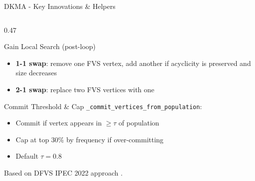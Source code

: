 \documentclass[aspectratio=169]{beamer}
\begin{document}
\begin{frame}{DKMA - Key Innovations \& Helpers}
\begin{columns}[T]
\begin{column}{0.47\textwidth}
\begin{block}{Gain Local Search (post-loop)}
\begin{itemize}
					\item \textbf{1-1 swap}: remove one FVS vertex, add another
					      if acyclicity is preserved and size decreases
					\item \textbf{2-1 swap}: replace two FVS vertices with one
				\end{itemize}
			\end{block}
			\vspace{4pt}
			\begin{block}{Commit Threshold \& Cap}
				\texttt{\_commit\_vertices\_from\_population}:
				\begin{itemize}
					\item Commit if vertex appears in $\ge \tau$ of population
					\item Cap at top 30\% by frequency if over-committing
					\item Default $\tau = 0.8$
				\end{itemize}
				Based on DFVS IPEC 2022 approach \cite{pace2022}.
			\end{block}
		\end{column}
	\end{columns}
\end{frame}
\end{document}
